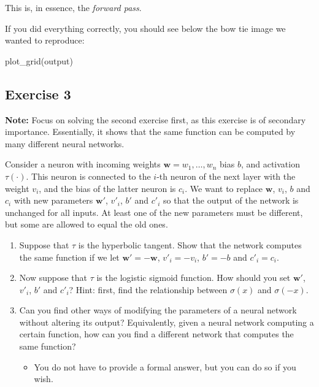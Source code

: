 \documentclass[
]{article}
\newenvironment{Shaded}{\begin{snugshade}}{\end{snugshade}}
\newcommand{\FunctionTok}[1]{\textcolor[rgb]{0.00,0.00,0.00}{#1}}
\newcommand{\NormalTok}[1]{#1}
\providecommand{\tightlist}{%
  \setlength{\itemsep}{0pt}\setlength{\parskip}{0pt}}
\begin{document}
This is, in essence, the \emph{forward pass}.

If you did everything correctly, you should see below the bow tie image
we wanted to reproduce:

\begin{Shaded}
\begin{Highlighting}[]
\FunctionTok{plot\_grid}\NormalTok{(output)}
\end{Highlighting}
\end{Shaded}

\hypertarget{exercise-3}{%
\subsection{Exercise 3}\label{exercise-3}}

\textbf{Note:} Focus on solving the second exercise first, as this
exercise is of secondary importance. Essentially, it shows that the same
function can be computed by many different neural networks.

Consider a neuron with incoming weights \(\textbf{w}=w_1,\ldots,w_n\)
bias \(b\), and activation \(\tau(\cdot)\). This neuron is connected to
the \(i\)-th neuron of the next layer with the weight \(v_i\), and the
bias of the latter neuron is \(c_i\). We want to replace \(\textbf{w}\),
\(v_i\), \(b\) and \(c_i\) with new parameters \(\textbf{w}'\),
\(v'_i\), \(b'\) and \(c'_i\) so that the output of the network is
unchanged for all inputs. At least one of the new parameters must be
different, but some are allowed to equal the old ones.

\begin{enumerate}
\def\labelenumi{\arabic{enumi}.}
\tightlist
\item
  Suppose that \(\tau\) is the hyperbolic tangent. Show that the network
  computes the same function if we let \(\textbf{w}'=-\textbf{w}\),
  \(v'_i=-v_i\), \(b'=-b\) and \(c'_i=c_i\).
\item
  Now suppose that \(\tau\) is the logistic sigmoid function. How should
  you set \(\textbf{w}'\), \(v'_i\), \(b'\) and \(c'_i\)? Hint: first,
  find the relationship between \(\sigma(x)\) and \(\sigma(-x)\).
\item
  Can you find other ways of modifying the parameters of a neural
  network without altering its output? Equivalently, given a neural
  network computing a certain function, how can you find a different
  network that computes the same function?

  \begin{itemize}
  \tightlist
  \item
    You do not have to provide a formal answer, but you can do so if you
    wish.
  \end{itemize}
\end{enumerate}
\end{document}
